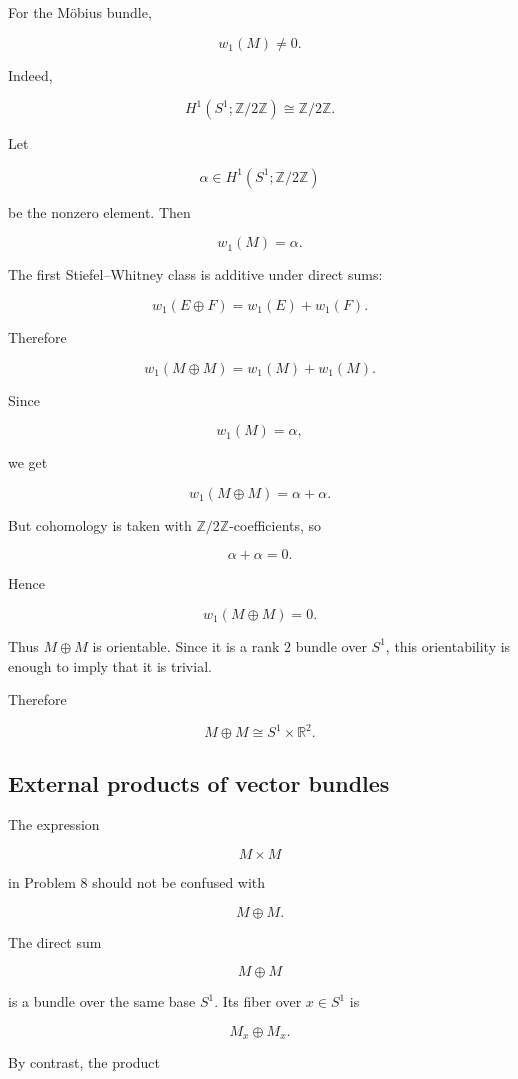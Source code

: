 \documentclass[12pt,a4paper]{article}
\newcommand{\R}{\mathbb{R}}
\newcommand{\Ztwo}{\mathbb{Z}/2\mathbb{Z}}
\theoremstyle{notespace}
\begin{document}
	For the M\"obius bundle,
	
	\[
	w_1(M)\neq 0.
	\]
	
	Indeed,
	
	\[
	H^{1}(S^{1};\Ztwo)\cong \Ztwo.
	\]
	
	Let
	
	\[
	\alpha\in H^{1}(S^{1};\Ztwo)
	\]
	
	be the nonzero element. Then
	
	\[
	w_1(M)=\alpha.
	\]
	
	The first Stiefel--Whitney class is additive under direct sums:
	
	\[
	w_1(E\oplus F)=w_1(E)+w_1(F).
	\]
	
	Therefore
	
	\[
	w_1(M\oplus M)
	=
	w_1(M)+w_1(M).
	\]
	
	Since
	
	\[
	w_1(M)=\alpha,
	\]
	
	we get
	
	\[
	w_1(M\oplus M)=\alpha+\alpha.
	\]
	
	But cohomology is taken with \(\Ztwo\)-coefficients, so
	
	\[
	\alpha+\alpha=0.
	\]
	
	Hence
	
	\[
	w_1(M\oplus M)=0.
	\]
	
	Thus \(M\oplus M\) is orientable. Since it is a rank \(2\) bundle over \(S^{1}\), this orientability is enough to imply that it is trivial.
	
	Therefore
	
	\[
	\boxed{
		M\oplus M\cong S^{1}\times \R^{2}.
	}
	\]
	
	\subsection{External products of vector bundles}
	
	The expression
	
	\[
	M\times M
	\]
	
	in Problem 8 should not be confused with
	
	\[
	M\oplus M.
	\]
	
	The direct sum
	
	\[
	M\oplus M
	\]
	
	is a bundle over the same base \(S^{1}\). Its fiber over \(x\in S^{1}\) is
	
	\[
	M_x\oplus M_x.
	\]
	
	By contrast, the product
	
\end{document}

